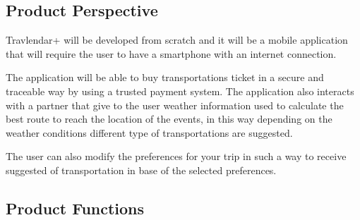 \subsection{Product Perspective}
Travlendar+ will be developed from scratch and it will be a mobile application that will require the user to have a smartphone with an internet connection.

The application will be able to buy transportations ticket in a secure and traceable way by using a trusted payment system. The application also interacts with a partner that give to the user weather information used to calculate the best route to reach the location of the events, in this way depending on the weather conditions different type of transportations are suggested.

 The user can also modify the preferences for your trip in such a way to  receive suggested of transportation in base of the selected preferences.

\subsection{Product Functions}

